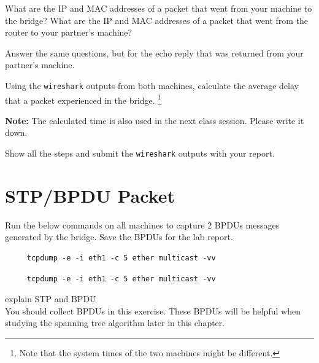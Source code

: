 \documentclass{UTNetLab}
\begin{document}
    \begin{report}
    \item What are the IP and MAC addresses of a packet that went from your machine to the bridge? What are the IP and MAC addresses of a packet that went from the router to your partner’s machine?
	

    \item Answer the same questions, but for the echo reply that was returned from your partner’s machine. 
    
    \item Using the \lstinline{wireshark} outputs from both machines, calculate the average delay that a packet experienced in the bridge. \footnote{Note that the system times of the two machines might be different.} 
  
  \textbf{ Note:} The calculated time is also used in the next class session. Please write it down. 
    \end{report}
	
    Show all the steps and submit the \lstinline{wireshark} outputs with your report.

\section{STP/BPDU Packet}
    Run the below commands on all machines to capture 2 BPDUs messages generated by the bridge. Save the BPDUs for the lab report.
            
     \begin{lstlisting}
     tcpdump -e -i eth1 -c 5 ether multicast -vv
     \end{lstlisting}

	\begin{lstlisting}
     tcpdump -e -i eth1 -c 5 ether multicast -vv
	\end{lstlisting}	     

	explain STP and BPDU \\

    You should collect BPDUs in this exercise.
    These BPDUs will be helpful when studying the spanning tree algorithm later in this chapter.
\end{document}
